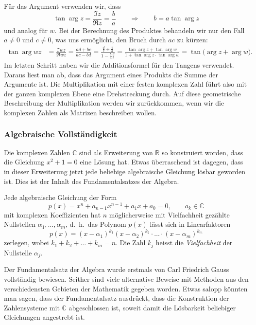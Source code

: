 Für das Argument verwenden wir, dass
\[
\tan\operatorname{arg}z
=
\frac{\Im z}{\Re z}
=
\frac{b}{a}
\qquad\Rightarrow\qquad
b=a\tan\operatorname{arg}z
\]
und analog für $w$.
Bei der Berechnung des Produktes behandeln wir nur den Fall $a\ne 0$ 
und $c\ne 0$, was uns ermöglicht, den Bruch durch $ac$ zu kürzen:
\begin{align*}
\tan\arg wz
&=
\frac{\Im wz}{\Re wz}
=
\frac{ad+bc}{ac-bd}
=
\frac{\frac{d}{c} + \frac{b}{a}}{1-\frac{b}{a}\frac{d}{c}}
=
\frac{
\tan\operatorname{arg}z+\tan\operatorname{arg}w
}{
1+
\tan\operatorname{arg}z\cdot\tan\operatorname{arg}w
}
=
\tan\bigl(
\operatorname{arg}z+\operatorname{arg}w
\bigr).
\end{align*}
Im letzten Schritt haben wir die Additionsformel für den Tangens verwendet.
%
Daraus liest man ab, dass das Argument eines Produkts die Summe der
Argumente ist.
Die Multiplikation mit einer festen komplexen Zahl führt also mit der ganzen
komplexen Ebene eine Drehstreckung durch.
Auf diese geometrische Beschreibung der Multiplikation werden wir zurückkommen,
wenn wir die komplexen Zahlen als Matrizen beschreiben wollen.

\subsubsection{Algebraische Vollständigkeit}
Die komplexen Zahlen $\mathbb{C}$ sind als Erweiterung von $\mathbb{R}$
so konstruiert worden, dass die Gleichung $x^2+1=0$ eine Lösung hat.
Etwas überraschend ist dagegen, dass in dieser Erweiterung jetzt jede
beliebige algebraische Gleichung lösbar geworden ist.
Dies ist der Inhalt des Fundamentalsatzes der Algebra.

\begin{satz}
\label{buch:zahlen:satz:fundamentalsatz}
%
Jede algebraische Gleichung der Form
\[
p(x)=x^n + a_{n-1}x^{n-1}+a_1x+a_0=0,\qquad a_k\in\mathbb{C}
\]
mit komplexen Koeffizienten hat $n$ möglicherweise mit Vielfachheit
gezählte Nullstellen $\alpha_1,\dots,\alpha_m$, d.~h.~das Polynom $p(x)$
lässt sich in Linearfaktoren
\[
p(x)
=
(x-\alpha_1)^{k_1}(x-\alpha_2)^{k_2}\cdot\ldots\cdot(x-\alpha_m)^{k_m}
\]
zerlegen, wobei $k_1+k_2+\dots+k_m=n$.
Die Zahl $k_j$ heisst die {\em Vielfachheit} der Nullstelle $\alpha_j$.
\end{satz}

Der Fundamentalsatz der Algebra wurde erstmals von Carl Friedrich Gauss
%
vollständig bewiesen.
Seither sind viele alternative Beweise mit Methoden aus den verschiedensten
Gebieten der Mathematik gegeben worden.
Etwas salopp könnten man sagen, dass der Fundamentalsatz ausdrückt, dass
die Konstruktion der Zahlensysteme mit $\mathbb{C}$ abgeschlossen ist,
soweit damit die Lösbarkeit beliebiger Gleichungen angestrebt ist.

